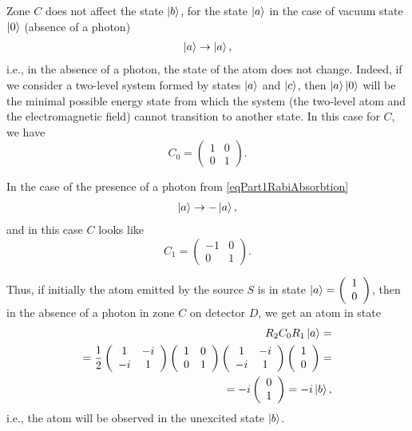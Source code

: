 Zone $C$ does not affect the state $\ket{b}$, for the state $\ket{a}$ in the case of vacuum state $\ket{0}$ (absence of a photon)
\begin{eqnarray}
  \ket{a} \rightarrow \ket{a},
  \nonumber
\end{eqnarray}
i.e., in the absence of a photon, the state of the atom does not change. Indeed, if we consider a two-level system formed by states $\ket{a}$ and $\ket{c}$, then $\ket{a}\ket{0}$ will be the minimal possible energy state from which the system (the two-level atom and the electromagnetic field) cannot transition to another state.
In this case for $C$, we have
\[
C_0 = \left(
\begin{array} {cc}
1 & 0
\\
0 & 1 
\end{array}
\right).
\]

In the case of the presence of a photon from \eqref{eqPart1RabiAbsorbtion}
\begin{eqnarray}
  \ket{a} \rightarrow -\ket{a},
  \nonumber
\end{eqnarray}
and in this case $C$ looks like
\[
C_1 = \left(
\begin{array} {cc}
-1 & 0
\\
0 & 1 
\end{array}
\right).
\]

Thus, if initially the atom emitted by the source $S$ is in state $\ket{a} = \left(
\begin{array} {c}
1
\\
0
\end{array}
\right)$, then in the absence of a photon in zone $C$ on detector $D$, we get an atom in state
\begin{eqnarray}
  R_2 C_0 R_1 \ket{a} =
  \nonumber \\
  =
  \frac{1}{2}
  \left(
  \begin{array} {cc}
    1 & -i
    \\
    -i & 1 
  \end{array}
  \right)
  \left(
  \begin{array} {cc}
    1 & 0
    \\
    0 & 1 
  \end{array}
  \right)
  \left(
  \begin{array} {cc}
    1 & -i
    \\
    -i & 1 
  \end{array}
  \right)
  \left(
  \begin{array} {c}
    1
    \\
    0
  \end{array}
  \right) =
  \nonumber \\
  =
  -i 
  \left(
  \begin{array} {c}
    0
    \\
    1
  \end{array}
  \right) =
  -i \ket{b},
  \nonumber
\end{eqnarray}
i.e., the atom will be observed in the unexcited state $\ket{b}$.

